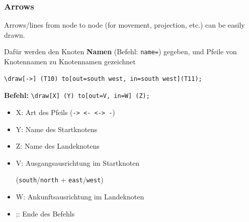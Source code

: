 \begin{frame}[fragile]
\frametitle{Arrows}

Arrows/lines from node to node (\fe for movement, projection, etc.) can be easily drawn. 
	
Dafür werden den Knoten \textbf{Namen} (Befehl: \lstinline|name=|) gegeben, und Pfeile von Knotennamen zu Knotennamen gezeichnet 
	
\begin{lstlisting}	
\draw[->] (T10) to[out=south west, in=south west](T11);	
\end{lstlisting}

	
	\textbf{Befehl:} \lstinline|\draw[X] (Y) to[out=V, in=W] (Z);|
	
	\begin{itemize}
		\item \alert{X}: Art des Pfeils (\lstinline|-> <- <-> -|)
		\item \alert{Y}: Name des Startknotens
		\item \alert{Z}: Name des Landeknotens
		\item \alert{V}: Ausgangsausrichtung im Startknoten
		
		(\lstinline|south|/\lstinline|north| + \lstinline|east|/\lstinline|west|)
		
		\item \alert{W}: Ankunftsausrichtung im Landeknoten
		\item \alert{;}: Ende des Befehls
	\end{itemize}
	


\end{frame}


